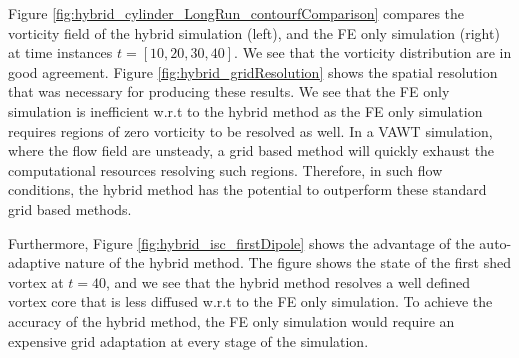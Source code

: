 
Figure \ref{fig:hybrid_cylinder_LongRun_contourfComparison} compares the vorticity field of the hybrid simulation (left), and the FE only simulation (right) at time instances $t=[10,20,30,40]$. We see that the vorticity distribution are in good agreement. Figure \ref{fig:hybrid_gridResolution} shows the spatial resolution that was necessary for producing these results. We see that the FE only simulation is inefficient w.r.t to the hybrid method as the FE only simulation requires regions of zero vorticity to be resolved as well. In a VAWT simulation, where the flow field are unsteady, a grid based method will quickly exhaust the computational resources resolving such regions. Therefore, in such flow conditions, the hybrid method has the potential to outperform these standard grid based methods.

Furthermore, Figure \ref{fig:hybrid_isc_firstDipole} shows the advantage of the auto-adaptive nature of the hybrid method. The figure shows the state of the first shed vortex at $t=40$, and we see that the hybrid method resolves a well defined vortex core that is less diffused w.r.t to the FE only simulation. To achieve the accuracy of the hybrid method, the FE only simulation would require an expensive grid adaptation at every stage of the simulation. 



